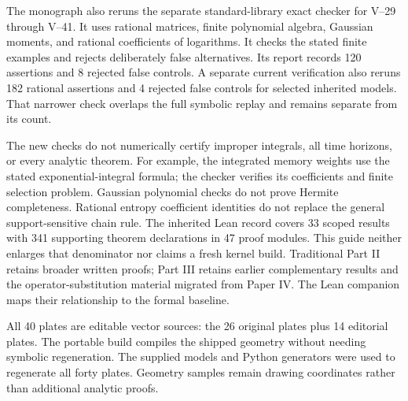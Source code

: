 The monograph also reruns the separate standard-library exact checker for V--29 through V--41. It uses rational matrices, finite polynomial algebra, Gaussian moments, and rational coefficients of logarithms. It checks the stated finite examples and rejects deliberately false alternatives. Its report records 120 assertions and 8 rejected false controls. A separate current verification also reruns 182 rational assertions and 4 rejected false controls for selected inherited models. That narrower check overlaps the full symbolic replay and remains separate from its count.

The new checks do not numerically certify improper integrals, all time horizons, or every analytic theorem. For example, the integrated memory weights use the stated exponential-integral formula; the checker verifies its coefficients and finite selection problem. Gaussian polynomial checks do not prove Hermite completeness. Rational entropy coefficient identities do not replace the general support-sensitive chain rule.
The inherited Lean record covers 33 scoped results with 341 supporting theorem declarations in 47 proof modules. This guide neither enlarges that denominator nor claims a fresh kernel build. Traditional Part II retains broader written proofs; Part III retains earlier complementary results and the operator-substitution material migrated from Paper IV. The Lean companion maps their relationship to the formal baseline.

All 40 plates are editable vector sources: the 26 original plates plus 14 editorial plates. The portable build compiles the shipped geometry without needing symbolic regeneration. The supplied models and Python generators were used to regenerate all forty plates. Geometry samples remain drawing coordinates rather than additional analytic proofs.

\endgroup
